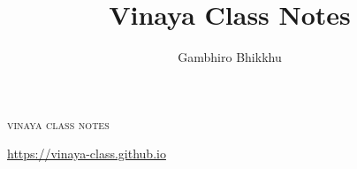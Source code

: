 \documentclass[11pt,oneside]{memoir}
\title{Vinaya Class Notes}
\author{Gambhiro Bhikkhu}
\begin{document}
\frontmatter

{\LARGE\scshape\MakeTextLowercase{Vinaya Class Notes}}

\href{https://vinaya-class.github.io}{https://vinaya-class.github.io}

\tableofcontents*



\mainmatter




























\backmatter


\end{document}
